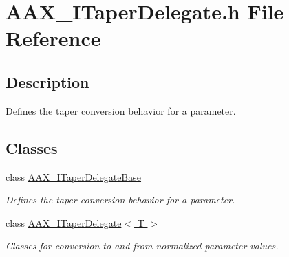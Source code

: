 \hypertarget{a00262}{}\section{A\+A\+X\+\_\+\+I\+Taper\+Delegate.\+h File Reference}
\label{a00262}


\subsection{Description}
Defines the taper conversion behavior for a parameter. 

\subsection*{Classes}
\begin{DoxyCompactItemize}
\item 
class \hyperlink{a00115}{A\+A\+X\+\_\+\+I\+Taper\+Delegate\+Base}
\begin{DoxyCompactList}\small\item\em Defines the taper conversion behavior for a parameter. \end{DoxyCompactList}\item 
class \hyperlink{a00114}{A\+A\+X\+\_\+\+I\+Taper\+Delegate$<$ T $>$}
\begin{DoxyCompactList}\small\item\em Classes for conversion to and from normalized parameter values. \end{DoxyCompactList}\end{DoxyCompactItemize}
